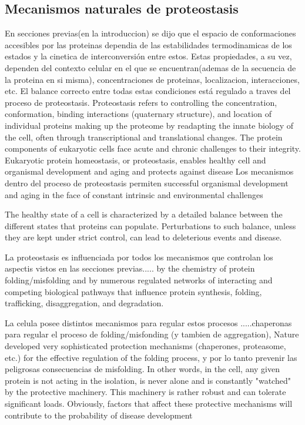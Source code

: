 \subsection{Mecanismos naturales de proteostasis}
En secciones previas(en la introduccion) se dijo que el espacio de conformaciones accesibles por las proteinas dependia de las estabilidades termodinamicas de los estados y la cinetica de interconversión entre estos. 
Estas propiedades, a su vez, dependen del contexto celular en el que se encuentran(ademas de la secuencia de la proteina en si misma), concentraciones de proteinas, localizacion, interacciones, etc.
El balance correcto entre todas estas condiciones está regulado a traves del proceso de proteostasis.
Proteostasis refers to controlling the concentration, conformation, binding interactions (quaternary structure), and location of individual proteins making up the proteome by readapting the innate biology of the cell, 
often through transcriptional and translational changes.
The protein components of eukaryotic cells face acute and chronic challenges to their integrity. Eukaryotic protein homeostasis, or proteostasis, enables healthy cell and organismal development and aging and protects against disease
Los mecanismos dentro del proceso de proteostasis permiten successful organismal development and aging in the face of constant intrinsic and environmental challenges %

The healthy state of a cell is characterized by a detailed balance between the different states that proteins can populate. 
Perturbations to such balance, unless they are kept under strict control, can lead to deleterious events and disease.


La proteostasis es influenciada por todos los mecanismos que controlan los aspectis vistos en las secciones previas..... by the chemistry of protein folding/misfolding and by numerous regulated networks of interacting and competing biological pathways 
that influence protein synthesis, folding, trafficking, disaggregation, and degradation.

La celula posee distintos mecanismos para regular estos procesos .....chaperonas para regular el proceso de folding/misfonding (y tambien de aggregation), 
Nature developed very sophisticated protection mechanisms (chaperones, proteasome, etc.) for the effective regulation of the folding process, y por lo tanto prevenir las peligrosas consecuencias de misfolding. 
In other words, in the cell, any given protein is not acting in the isolation, is never alone and is
constantly "watched" by the protective machinery. This machinery is rather robust and can
tolerate significant loads. Obviously, factors that affect these protective mechanisms will
contribute to the probability of disease development


